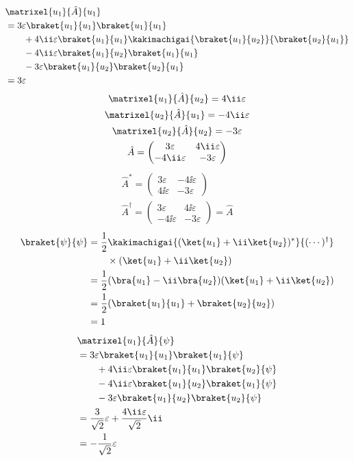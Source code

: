 \begin{align*}
&\matrixel{u_{1}}{\hat{A}}{u_{1}}\\
&=3\varepsilon\braket{u_{1}}{u_{1}}\braket{u_{1}}{u_{1}}\\
&\qquad+4\ii\varepsilon\braket{u_{1}}{u_{1}}\kakimachigai{\braket{u_{1}}{u_{2}}}{\braket{u_{2}}{u_{1}}}\\
&\qquad-4\ii\varepsilon\braket{u_{1}}{u_{2}}\braket{u_{1}}{u_{1}}\\
&\qquad-3\varepsilon\braket{u_{1}}{u_{2}}\braket{u_{2}}{u_{1}}\\
&=3\varepsilon
\end{align*}
\begin{gather*}
\matrixel{u_{1}}{\hat{A}}{u_{2}}=4\ii\varepsilon\\
\matrixel{u_{2}}{\hat{A}}{u_{1}}=-4\ii\varepsilon\\
\matrixel{u_{2}}{\hat{A}}{u_{2}}=-3\varepsilon\\
\hat{A}=\begin{pmatrix}3\varepsilon&4\ii\varepsilon\\-4\ii\varepsilon&-3\varepsilon\end{pmatrix}
\end{gather*}
\begin{gather*}
\hat{A}^{*}=\begin{pmatrix}3\varepsilon&-4\ii\varepsilon\\4\ii\varepsilon&-3\varepsilon\end{pmatrix}\\
\hat{A}^{\dagger}=\begin{pmatrix}3\varepsilon&4\ii\varepsilon\\-4\ii\varepsilon&-3\varepsilon\end{pmatrix}=\hat{A}
\end{gather*}
\begin{align*}
\braket{\psi}{\psi}&=\frac{1}{2}\kakimachigai{(\ket{u_{1}}+\ii\ket{u_{2}})^{*}}{(\cdots)^{\dagger}}\\
&\qquad\times(\ket{u_{1}}+\ii\ket{u_{2}})\\
&=\frac{1}{2}(\bra{u_{1}}-\ii\bra{u_{2}})(\ket{u_{1}}+\ii\ket{u_{2}})\\
&=\frac{1}{2}(\braket{u_{1}}{u_{1}}+\braket{u_{2}}{u_{2}})\\
&=1
\end{align*}
\begin{align*}
&\matrixel{u_{1}}{\hat{A}}{\psi}\\
&=3\varepsilon\braket{u_{1}}{u_{1}}\braket{u_{1}}{\psi}\\
&\qquad+4\ii\varepsilon\braket{u_{1}}{u_{1}}\braket{u_{2}}{\psi}\\
&\qquad-4\ii\varepsilon\braket{u_{1}}{u_{2}}\braket{u_{1}}{\psi}\\
&\qquad-3\varepsilon\braket{u_{1}}{u_{2}}\braket{u_{2}}{\psi}\\
&=\frac{3}{\sqrt{2}}\varepsilon+\frac{4\ii\varepsilon}{\sqrt{2}}\ii\\
&=-\frac{1}{\sqrt{2}}\varepsilon
\end{align*}
